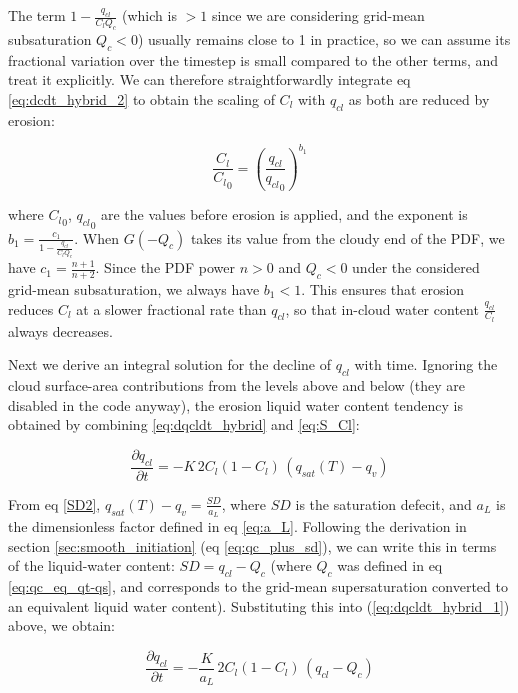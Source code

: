\documentclass{UMDP_article}
\begin{document}
\begin{enumerate}
\begin{enumerate}
The term $1 - \frac{q_{cl}}{C_l Q_c}$ (which is $> 1$ since we are considering
grid-mean subsaturation $Q_c < 0$) usually remains close to 1 in practice,
so we can assume its fractional variation over the timestep is small
compared to the other terms, and treat it explicitly.
We can therefore straightforwardly integrate eq \ref{eq:dcdt_hybrid_2}
to obtain the scaling of $C_l$ with $q_{cl}$ as both are reduced by erosion:

\begin{equation}
\frac{C_l}{{C_l}_0} = \left( \frac{q_{cl}}{{q_{cl}}_0} \right)^{b_1}
\label{eq:cl_qcl_scaling}
\end{equation}

where ${C_l}_0$, ${q_{cl}}_0$ are the values before erosion is applied,
and the exponent is $b_1 = \frac{ c_1 }{ 1 - \frac{q_{cl}}{C_l Q_c} }$.
When $G(-Q_c)$ takes its value from the cloudy end of the PDF, we have
$c_1 = \frac{n+1}{n+2}$.  Since the PDF power $n > 0$ and $Q_c < 0$
under the considered grid-mean subsaturation, we always have $b_1 < 1$.
This ensures that erosion reduces $C_l$ at a slower fractional rate than
$q_{cl}$, so that in-cloud water content $\frac{q_{cl}}{C_l}$ always decreases.

Next we derive an integral solution for the decline of $q_{cl}$ with time.
Ignoring the cloud surface-area contributions from the levels above and below
(they are disabled in the code anyway), the erosion liquid water content
tendency is obtained by combining \ref{eq:dqcldt_hybrid} and \ref{eq:S_Cl}:

\begin{equation}
\frac{\partial q_{cl}}{\partial t} = -K \, 2 C_l (1 - C_l) \, (q_{sat}(T)-q_v)
\label{eq:dqcldt_hybrid_1}
\end{equation}

From eq \ref{SD2}, $q_{sat}(T)-q_v = \frac{SD}{a_L}$, where $SD$ is the
saturation defecit, and $a_L$ is the dimensionless factor defined in
eq \ref{eq:a_L}.  Following the derivation in section
\ref{sec:smooth_initiation} (eq \ref{eq:qc_plus_sd}),
we can write this in terms of the liquid-water content: $SD = q_{cl} - Q_c$
(where $Q_c$ was defined in eq \ref{eq:qc_eq_qt-qs}, and corresponds to the
grid-mean supersaturation converted to an equivalent liquid water content).
Substituting this into (\ref{eq:dqcldt_hybrid_1}) above, we obtain:

\begin{equation}
\frac{\partial q_{cl}}{\partial t} = -\frac{K}{a_L} \, 2 C_l (1 - C_l) \,
                                    (q_{cl}-Q_c)
\label{eq:dqcldt_hybrid_2}
\end{equation}


\end{enumerate}
\end{enumerate}
\end{document}
